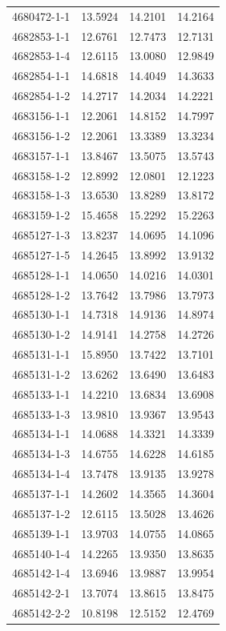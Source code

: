 \begin{longtable}{lrrr}
4680472-1-1 & 13.5924 & 14.2101 & 14.2164 \\
4682853-1-1 & 12.6761 & 12.7473 & 12.7131 \\
4682853-1-4 & 12.6115 & 13.0080 & 12.9849 \\
4682854-1-1 & 14.6818 & 14.4049 & 14.3633 \\
4682854-1-2 & 14.2717 & 14.2034 & 14.2221 \\
4683156-1-1 & 12.2061 & 14.8152 & 14.7997 \\
4683156-1-2 & 12.2061 & 13.3389 & 13.3234 \\
4683157-1-1 & 13.8467 & 13.5075 & 13.5743 \\
4683158-1-2 & 12.8992 & 12.0801 & 12.1223 \\
4683158-1-3 & 13.6530 & 13.8289 & 13.8172 \\
4683159-1-2 & 15.4658 & 15.2292 & 15.2263 \\
4685127-1-3 & 13.8237 & 14.0695 & 14.1096 \\
4685127-1-5 & 14.2645 & 13.8992 & 13.9132 \\
4685128-1-1 & 14.0650 & 14.0216 & 14.0301 \\
4685128-1-2 & 13.7642 & 13.7986 & 13.7973 \\
4685130-1-1 & 14.7318 & 14.9136 & 14.8974 \\
4685130-1-2 & 14.9141 & 14.2758 & 14.2726 \\
4685131-1-1 & 15.8950 & 13.7422 & 13.7101 \\
4685131-1-2 & 13.6262 & 13.6490 & 13.6483 \\
4685133-1-1 & 14.2210 & 13.6834 & 13.6908 \\
4685133-1-3 & 13.9810 & 13.9367 & 13.9543 \\
4685134-1-1 & 14.0688 & 14.3321 & 14.3339 \\
4685134-1-3 & 14.6755 & 14.6228 & 14.6185 \\
4685134-1-4 & 13.7478 & 13.9135 & 13.9278 \\
4685137-1-1 & 14.2602 & 14.3565 & 14.3604 \\
4685137-1-2 & 12.6115 & 13.5028 & 13.4626 \\
4685139-1-1 & 13.9703 & 14.0755 & 14.0865 \\
4685140-1-4 & 14.2265 & 13.9350 & 13.8635 \\
4685142-1-4 & 13.6946 & 13.9887 & 13.9954 \\
4685142-2-1 & 13.7074 & 13.8615 & 13.8475 \\
4685142-2-2 & 10.8198 & 12.5152 & 12.4769 \\

\end{longtable}
